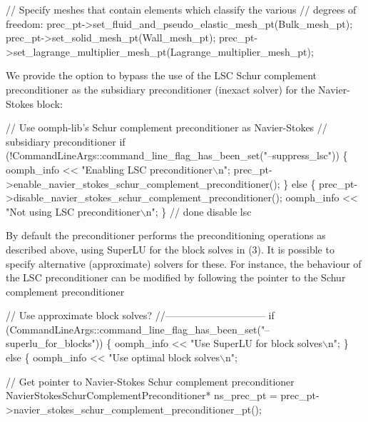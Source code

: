 \begin{DoxyCodeInclude}
 \textcolor{comment}{// Specify meshes that contain elements which classify the various}
 \textcolor{comment}{// degrees of freedom:}
 prec\_pt->set\_fluid\_and\_pseudo\_elastic\_mesh\_pt(Bulk\_mesh\_pt);
 prec\_pt->set\_solid\_mesh\_pt(Wall\_mesh\_pt);
 prec\_pt->set\_lagrange\_multiplier\_mesh\_pt(Lagrange\_multiplier\_mesh\_pt);

\end{DoxyCodeInclude}


We provide the option to bypass the use of the L\+SC Schur complement preconditioner as the subsidiary preconditioner (inexact solver) for the Navier-\/\+Stokes block\+:


\begin{DoxyCodeInclude}
 \textcolor{comment}{// Use oomph-lib's Schur complement preconditioner as Navier-Stokes}
 \textcolor{comment}{// subsidiary preconditioner}
 \textcolor{keywordflow}{if} (!CommandLineArgs::command\_line\_flag\_has\_been\_set(\textcolor{stringliteral}{"--suppress\_lsc"}))
  \{
   oomph\_info << \textcolor{stringliteral}{"Enabling LSC preconditioner\(\backslash\)n"};
   prec\_pt->enable\_navier\_stokes\_schur\_complement\_preconditioner();
  \}
 \textcolor{keywordflow}{else}
  \{
   prec\_pt->disable\_navier\_stokes\_schur\_complement\_preconditioner();
   oomph\_info << \textcolor{stringliteral}{"Not using LSC preconditioner\(\backslash\)n"};
  \} \textcolor{comment}{// done disable lsc}

\end{DoxyCodeInclude}


By default the preconditioner performs the preconditioning operations as described above, using Super\+LU for the block solves in (3). It is possible to specify alternative (approximate) solvers for these. For instance, the behaviour of the L\+SC preconditioner can be modified by following the pointer to the Schur complement preconditioner


\begin{DoxyCodeInclude}


 \textcolor{comment}{// Use approximate block solves?}
 \textcolor{comment}{//------------------------------}
 \textcolor{keywordflow}{if} (CommandLineArgs::command\_line\_flag\_has\_been\_set(\textcolor{stringliteral}{"--superlu\_for\_blocks"}))
  \{
   oomph\_info << \textcolor{stringliteral}{"Use SuperLU for block solves\(\backslash\)n"};
  \}
 \textcolor{keywordflow}{else}
  \{
   oomph\_info << \textcolor{stringliteral}{"Use optimal block solves\(\backslash\)n"};

   \textcolor{comment}{// Get pointer to Navier-Stokes Schur complement preconditioner}
   NavierStokesSchurComplementPreconditioner* ns\_prec\_pt = 
    prec\_pt->navier\_stokes\_schur\_complement\_preconditioner\_pt();

\end{DoxyCodeInclude}



